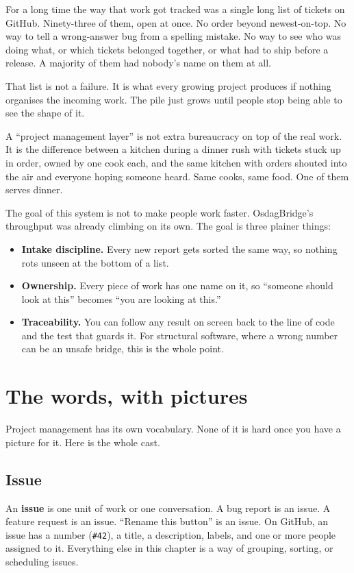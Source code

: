 \documentclass[11pt,a4paper]{report}
\newcommand{\code}[1]{\texttt{#1}}
\begin{document}
For a long time the way that work got tracked was a single long list of tickets on
GitHub. Ninety-three of them, open at once. No order beyond newest-on-top. No way
to tell a wrong-answer bug from a spelling mistake. No way to see who was doing
what, or which tickets belonged together, or what had to ship before a release. A
majority of them had nobody's name on them at all.

That list is not a failure. It is what every growing project produces if nothing
organises the incoming work. The pile just grows until people stop being able to
see the shape of it.

\begin{plainenglish}
A ``project management layer'' is not extra bureaucracy on top of the real work.
It is the difference between a kitchen during a dinner rush with tickets stuck up
in order, owned by one cook each, and the same kitchen with orders shouted into
the air and everyone hoping someone heard. Same cooks, same food. One of them
serves dinner.
\end{plainenglish}

The goal of this system is not to make people work faster. OsdagBridge's throughput
was already climbing on its own. The goal is three plainer things:

\begin{itemize}[leftmargin=1.4em,itemsep=3pt]
  \item \textbf{Intake discipline.} Every new report gets sorted the same way, so
        nothing rots unseen at the bottom of a list.
  \item \textbf{Ownership.} Every piece of work has one name on it, so ``someone
        should look at this'' becomes ``you are looking at this.''
  \item \textbf{Traceability.} You can follow any result on screen back to the
        line of code and the test that guards it. For structural software, where
        a wrong number can be an unsafe bridge, this is the whole point.
\end{itemize}

\chapter{The words, with pictures}

Project management has its own vocabulary. None of it is hard once you have a
picture for it. Here is the whole cast.

\section{Issue}
An \textbf{issue} is one unit of work or one conversation. A bug report is an
issue. A feature request is an issue. ``Rename this button'' is an issue. On
GitHub, an issue has a number (\code{\#42}), a title, a description, labels, and
one or more people assigned to it. Everything else in this chapter is a way of
grouping, sorting, or scheduling issues.
\end{document}
